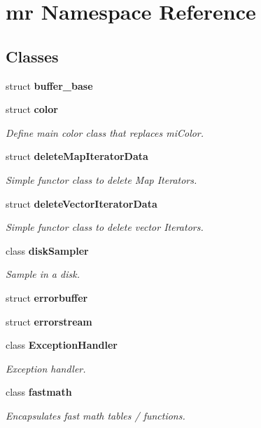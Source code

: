 \section{mr Namespace Reference}
\label{namespacemr}


\subsection*{Classes}
\begin{CompactItemize}
\item 
struct {\bf buffer\_\-base}
\item 
struct {\bf color}
\begin{CompactList}\small\item\em Define main color class that replaces mi\-Color. \item\end{CompactList}\item 
struct {\bf delete\-Map\-Iterator\-Data}
\begin{CompactList}\small\item\em Simple functor class to delete Map Iterators. \item\end{CompactList}\item 
struct {\bf delete\-Vector\-Iterator\-Data}
\begin{CompactList}\small\item\em Simple functor class to delete vector Iterators. \item\end{CompactList}\item 
class {\bf disk\-Sampler}
\begin{CompactList}\small\item\em Sample in a disk. \item\end{CompactList}\item 
struct {\bf errorbuffer}
\item 
struct {\bf errorstream}
\item 
class {\bf Exception\-Handler}
\begin{CompactList}\small\item\em Exception handler. \item\end{CompactList}\item 
class {\bf fastmath}
\begin{CompactList}\small\item\em Encapsulates fast math tables / functions. \item\end{CompactList}\item 

\end{CompactItemize}
